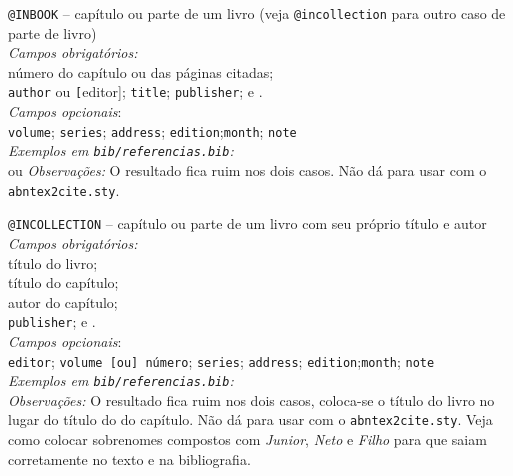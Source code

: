 \begin{alineas}
	\item \verb|@INBOOK| -- capítulo ou parte de um livro (veja 
		\verb|@incollection| para outro caso de parte de livro) \\
		\emph{Campos obrigatórios:}\\
 			 número do capítulo ou das páginas 
 			  citadas;\\
 			\texttt{author} ou \texttt[editor]; \texttt{title}; 
 			\texttt{publisher}; e .\\
		\emph{Campos opcionais}:\\
			\texttt{volume}; \texttt{series}; \texttt{address};
			\texttt{edition};\texttt{month}; \texttt{note}\\
		\emph{Exemplos em \texttt{bib/referencias.bib}:} \\
			\hspace*{1em} ou 
			\cite{kop95c3,epe13a} 
	\emph{Observações:} O resultado fica ruim nos dois casos.
			Não dá para usar com o \texttt{abntex2cite.sty}.
		
	\item \verb|@INCOLLECTION| -- capítulo ou parte de um livro com
		seu próprio título e autor \\
		\emph{Campos obrigatórios:}\\
 			  título do livro;\\
 			 título do capítulo; \\
 			 autor do capítulo; \\
 			\texttt{publisher}; e .\\
		\emph{Campos opcionais}:\\
			\texttt{editor}; \texttt{volume [ou] número}; 
			\texttt{series}; \texttt{address};
			\texttt{edition};\texttt{month}; \texttt{note}\\
		\emph{Exemplos em \texttt{bib/referencias.bib}:} \\
			\hspace*{1em} 
			\cite{cop05c2,cope2005}
		\emph{Observações:} O resultado fica ruim nos dois casos, 
			coloca-se o título do livro no lugar do título do 
			do capítulo. Não dá para usar com o \texttt{abntex2cite.sty}. 
			Veja como colocar sobrenomes compostos com \emph{Junior}, 
			\emph{Neto} e \emph{Filho} para que saiam corretamente
			no texto e na bibliografia. 


\end{alineas}
